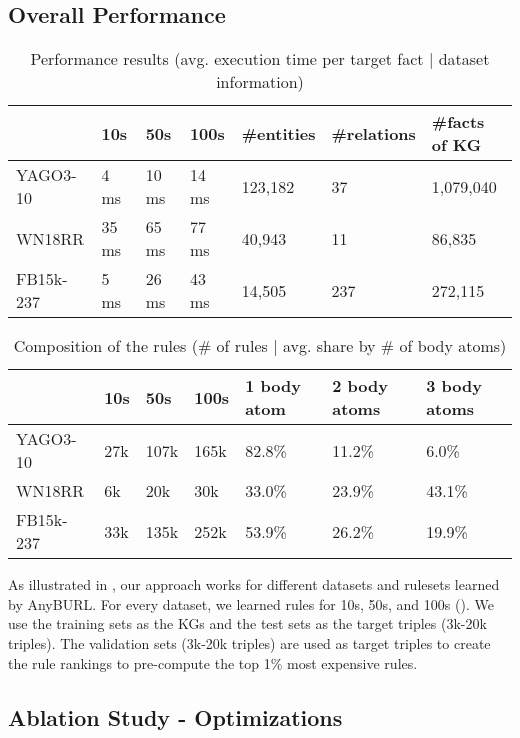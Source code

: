 \documentclass[english]{lni}
\begin{document}
\subsection{Overall Performance}

\begin{table}[t]
\centering
\begin{tabular}{l|lll|lll}
\toprule
 & 10s & 50s  & 100s & \#entities & \#relations & \#facts of KG\\
\midrule
YAGO3-10 & 4 ms & 10 ms & 14 ms & 123,182 & 37 & 1,079,040\\
WN18RR & 35 ms & 65 ms & 77 ms & 40,943 & 11 & 86,835\\
FB15k-237 & 5 ms & 26 ms & 43 ms & 14,505 & 237 & 272,115\\
\bottomrule
\end{tabular}
\caption{Performance results (avg. execution time per target fact | dataset information)}
\label{tab:overall}
\end{table}

\begin{table}[t]
\centering
\begin{tabular}{l|lll|lll}
\toprule
 & 10s & 50s & 100s & 1 body atom & 2 body atoms & 3 body atoms\\
\midrule
YAGO3-10 & 27k & 107k & 165k & 82.8\% & 11.2\% & 6.0\%\\
WN18RR & 6k & 20k & 30k & 33.0\% & 23.9\% & 43.1\%\\
FB15k-237 & 33k & 135k & 252k & 53.9\% & 26.2\% & 19.9\%\\
\bottomrule
\end{tabular}
\caption{Composition of the rules (\# of rules | avg. share by \# of body atoms)}
\label{tab:rules}
\end{table}

As illustrated in , our approach works for different datasets and rulesets learned by AnyBURL. For every dataset, we learned rules for 10s, 50s, and 100s (). We use the training sets as the KGs and the test sets as the target triples (3k-20k triples). The validation sets (3k-20k triples) are used as target triples to create the rule rankings to pre-compute the top 1\% most expensive rules.

\subsection{Ablation Study - Optimizations} 
\end{document}
